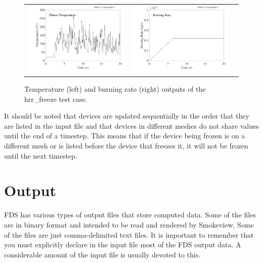 \documentclass[11pt]{book}
\begin{document}
\begin{figure}[ht]
\begin{tabular*}{\textwidth}{lll}
\includegraphics[width=3.0in]{SCRIPT_FIGURES/hrr_freeze_T} &
\includegraphics[width=3.0in]{SCRIPT_FIGURES/hrr_freeze_B} &
\end{tabular*}
\caption[Example of freezing the output of a {\ct RAMP}]{Temperature (left) and burning rate (right) outputs of the {\ct hrr\_freeze} test case.}
\label{freeze_hrr}
\end{figure}

It should be noted that devices are updated sequentially in the order that they are listed in the input file and that devices in different meshes do not share values until the end of a timestep.  This means that if the device being frozen is on a different mesh or is listed before the device that freezes it, it will not be frozen until the next timestep.

\clearpage





\chapter{Output}
\label{info:outputdata}

FDS has various types of output files that store computed data. Some of the files are in binary format and intended to be read and
rendered by Smokeview. Some of the files are just comma-delimited text files. It is important to remember that you must explicitly declare in
the input file most of the FDS output data. A considerable amount of the input file is usually devoted to this.
\end{document}
